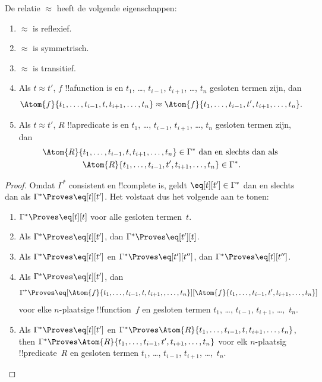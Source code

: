 \documentclass[openany]{memoir}
\begin{document}
\begin{prop}
De relatie $\approx$ heeft de volgende eigenschappen:
\begin{enumerate}
\item $\approx$ is reflexief.
\item $\approx$ is symmetrisch.
\item  $\approx$ is transitief.
\item Als $t \approx t'$, $f$ !!a{function} is en $t_1$, \dots,
  $t_{i-1}$, $t_{i+1}$, \dots, $t_n$ gesloten termen zijn, dan
\[
\Atom{f}{t_1,\dots, t_{i-1}, t, t_{i+1}, \dots, t_n} \approx
\Atom{f}{t_1,\dots, t_{i-1}, t', t_{i+1}, \dots, t_n}.
\]
\item Als $t \approx t'$, $R$ !!a{predicate} is en $t_1$, \dots,
  $t_{i-1}$, $t_{i+1}$, \dots, $t_n$ gesloten termen zijn, dan
\begin{multline*}
\Atom{R}{t_1,\dots, t_{i-1}, t, t_{i+1}, \dots, t_n} \in \Gamma^* \text{ dan en slechts dan als } \\
\Atom{R}{t_1,\dots, t_{i-1}, t', t_{i+1}, \dots, t_n} \in \Gamma^*.
\end{multline*}
\end{enumerate}
\end{prop}

\begin{proof}
Omdat $\Gamma^*$ consistent en !!{complete} is, geldt
$\eq[t][t'] \in \Gamma^*$ dan en slechts dan als
$\Gamma^* \Proves \eq[t][t']$. Het volstaat dus het volgende aan te tonen:
\begin{enumerate}
\item $\Gamma^* \Proves \eq[t][t]$ voor alle gesloten termen~$t$.
\item Als $\Gamma^* \Proves \eq[t][t']$, dan $\Gamma^* \Proves \eq[t'][t]$.
\item Als $\Gamma^* \Proves \eq[t][t']$ en $\Gamma^* \Proves
  \eq[t'][t'']$, dan $\Gamma^* \Proves \eq[t][t'']$.
\item Als $\Gamma^* \Proves \eq[t][t']$, dan
\[
\Gamma^* \Proves
\eq[\Atom{f}{t_1,\dots,t_{i-1},t,t_{i+1},,\dots,t_n}][\Atom{f}{t_1,\dots,t_{i-1},t',t_{i+1},\dots,t_n}]
\]
voor elke $n$-plaatsige !!{function}~$f$ en gesloten termen $t_1$, \dots,
$t_{i-1}$, $t_{i+1}$, \dots,~$t_n$.
\item Als $\Gamma^* \Proves \eq[t][t']$ en
$\Gamma^* \Proves
\Atom{R}{t_1,\dots,t_{i-1},t,t_{i+1},\dots,t_n}$, then
$\Gamma^* \Proves \Atom{R}{t_1,\dots,t_{i-1},t',t_{i+1},\dots,t_n}$
voor elk $n$-plaatsig !!{predicate}~$R$ en gesloten termen $t_1$, \dots,
$t_{i-1}$, $t_{i+1}$, \dots,~$t_n$.
\end{enumerate}
\end{proof}
\end{document}
